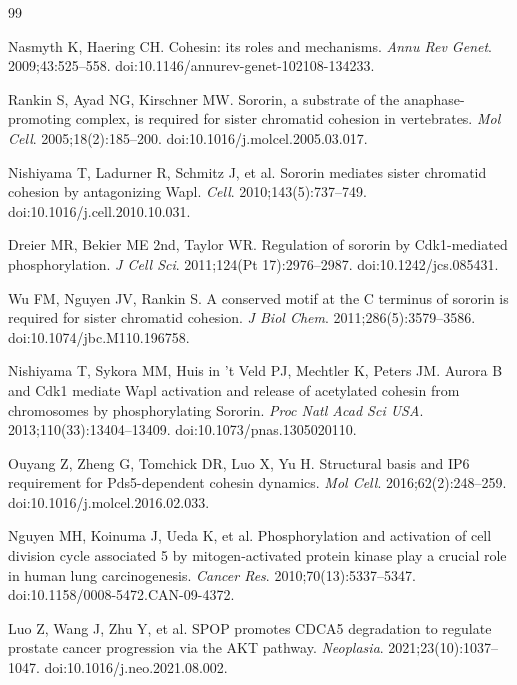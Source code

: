 \documentclass[11pt]{article}
\begin{document}
\begin{thebibliography}{99}
\setlength{\itemsep}{1pt}

 Nasmyth K, Haering CH. Cohesin: its roles and mechanisms. \textit{Annu Rev Genet}. 2009;43:525--558. doi:10.1146/annurev-genet-102108-134233.

 Rankin S, Ayad NG, Kirschner MW. Sororin, a substrate of the anaphase-promoting complex, is required for sister chromatid cohesion in vertebrates. \textit{Mol Cell}. 2005;18(2):185--200. doi:10.1016/j.molcel.2005.03.017.

 Nishiyama T, Ladurner R, Schmitz J, et al. Sororin mediates sister chromatid cohesion by antagonizing Wapl. \textit{Cell}. 2010;143(5):737--749. doi:10.1016/j.cell.2010.10.031.

 Dreier MR, Bekier ME 2nd, Taylor WR. Regulation of sororin by Cdk1-mediated phosphorylation. \textit{J Cell Sci}. 2011;124(Pt 17):2976--2987. doi:10.1242/jcs.085431.

 Wu FM, Nguyen JV, Rankin S. A conserved motif at the C terminus of sororin is required for sister chromatid cohesion. \textit{J Biol Chem}. 2011;286(5):3579--3586. doi:10.1074/jbc.M110.196758.

 Nishiyama T, Sykora MM, Huis in 't Veld PJ, Mechtler K, Peters JM. Aurora B and Cdk1 mediate Wapl activation and release of acetylated cohesin from chromosomes by phosphorylating Sororin. \textit{Proc Natl Acad Sci USA}. 2013;110(33):13404--13409. doi:10.1073/pnas.1305020110.

 Ouyang Z, Zheng G, Tomchick DR, Luo X, Yu H. Structural basis and IP6 requirement for Pds5-dependent cohesin dynamics. \textit{Mol Cell}. 2016;62(2):248--259. doi:10.1016/j.molcel.2016.02.033.

 Nguyen MH, Koinuma J, Ueda K, et al. Phosphorylation and activation of cell division cycle associated 5 by mitogen-activated protein kinase play a crucial role in human lung carcinogenesis. \textit{Cancer Res}. 2010;70(13):5337--5347. doi:10.1158/0008-5472.CAN-09-4372.

 Luo Z, Wang J, Zhu Y, et al. SPOP promotes CDCA5 degradation to regulate prostate cancer progression via the AKT pathway. \textit{Neoplasia}. 2021;23(10):1037--1047. doi:10.1016/j.neo.2021.08.002.


\end{thebibliography}
\end{document}
